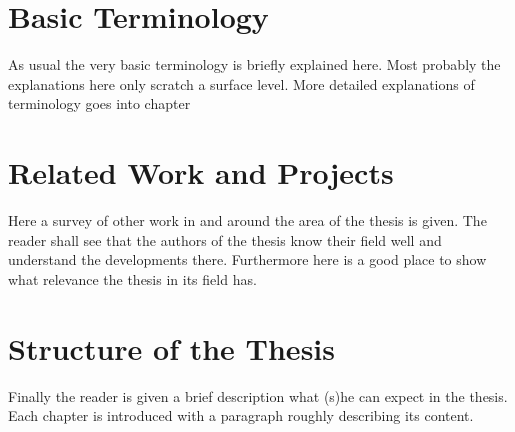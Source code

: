 \section{Basic Terminology}
As usual the very basic terminology is briefly explained here. Most probably the explanations here only scratch a surface level. More detailed explanations of terminology goes into chapter%

\section{Related Work and Projects}
Here a survey of other work in and around the area of the thesis is given. The reader shall see that the authors of the thesis know their field well and understand the developments there. Furthermore here is a good place to show what relevance the thesis in its field has.

\section{Structure of the Thesis}
Finally the reader is given a brief description what (s)he can expect in the thesis. Each chapter is introduced with a paragraph roughly describing its content.
